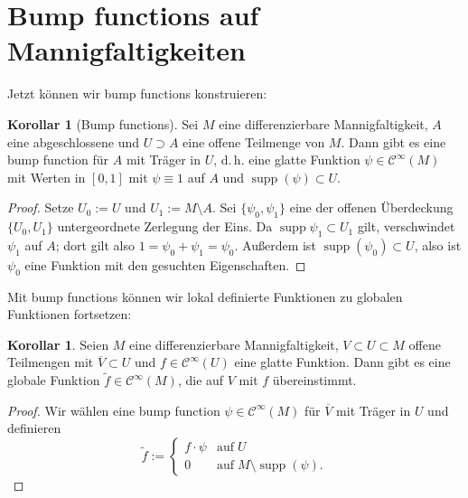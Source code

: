 \documentclass[a4paper]{scrreprt}
\numberwithin{equation}{chapter}
\DeclareMathOperator{\supp}{supp}
\newcommand{\sC}{\mathcal{C}^{\infty}}
\theoremstyle{definition}
\newtheorem{kor}[defn]{Korollar}
\begin{document}
\section{Bump functions auf Mannigfaltigkeiten}
Jetzt können wir bump functions konstruieren:
\begin{kor}[Bump functions]
	Sei $M$ eine differenzierbare Mannigfaltigkeit, $A$ eine abgeschlossene und $U \supset A$ eine offene Teilmenge von $M$. Dann gibt es eine bump function für $A$ mit Träger in $U$, d.\,h. eine glatte Funktion $\psi \in \sC(M)$ mit Werten in $[0,1]$ mit $\psi \equiv 1$ auf $A$ und $\supp(\psi) \subset U$.

	\begin{proof}
		Setze $U_0 := U$ und $U_1 := M \setminus A$. Sei $\{\psi_0, \psi_1\}$ eine der offenen Überdeckung $\{U_0, U_1\}$ untergeordnete Zerlegung der Eins. Da $\supp{\psi_1} \subset U_1$ gilt, verschwindet $\psi_1$ auf $A$; dort gilt also $1 = \psi_0 + \psi_1 = \psi_0$. Außerdem ist $\supp(\psi_0) \subset U$, also ist $\psi_0$ eine Funktion mit den gesuchten Eigenschaften.
	\end{proof}
\end{kor}

Mit bump functions können wir lokal definierte Funktionen zu globalen Funktionen fortsetzen:
\begin{kor}
	Seien $M$ eine differenzierbare Mannigfaltigkeit, $V \subset U \subset M$ offene Teilmengen mit $\overline{V} \subset U$ und $f \in \sC(U)$ eine glatte Funktion. Dann gibt es eine globale Funktion $\tilde f \in \sC(M)$, die auf $V$ mit $f$ übereinstimmt.

	\begin{proof}
		Wir wählen eine bump function $\psi \in \sC(M)$ für $\overline{V}$ mit Träger in $U$ und definieren
		\[\tilde f := \begin{cases}
		f \cdot \psi & \text{auf} \; U\\
		0 & \text{auf} \; M \setminus \supp(\psi).
		\end{cases}\]
	\end{proof}
\end{kor}
\end{document}
